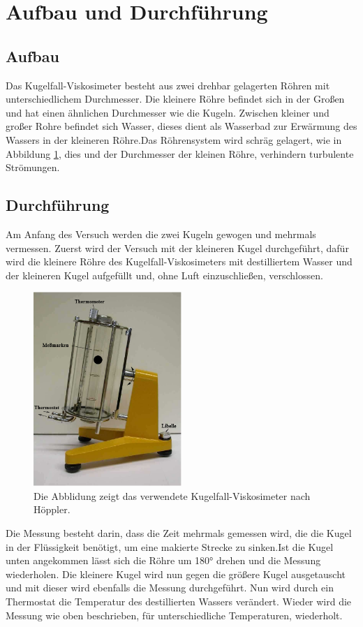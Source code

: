 \newpage
\section{Aufbau und Durchführung}
\subsection{Aufbau}
Das Kugelfall-Viskosimeter besteht aus zwei drehbar gelagerten Röhren mit unterschiedlichem Durchmesser.
Die kleinere Röhre befindet sich in der Großen und hat einen ähnlichen Durchmesser wie die Kugeln.
Zwischen kleiner und großer Rohre befindet sich Wasser, dieses dient als Wasserbad zur Erwärmung des
Wassers in der kleineren Röhre.Das Röhrensystem wird schräg gelagert, wie in Abbildung \ref{abb:visko},
dies und der Durchmesser der kleinen Röhre, verhindern turbulente Strömungen.
\subsection{Durchführung}
\label{sec:Durchführung}
Am Anfang des Versuch werden die zwei Kugeln gewogen
und mehrmals vermessen. Zuerst wird der Versuch mit
der kleineren Kugel durchgeführt, dafür wird die kleinere
Röhre des Kugelfall-Viskosimeters mit destilliertem Wasser und der kleineren Kugel
aufgefüllt und, ohne Luft einzuschließen, verschlossen.
\begin{figure}
 \centering
 \includegraphics[width=0.5\textwidth]{bild.PNG}
\caption{Die Abblidung zeigt das verwendete Kugelfall-Viskosimeter nach Höppler.\cite{sample}}
\label{abb:visko}
\end{figure}
Die Messung besteht darin, dass die Zeit mehrmals
gemessen wird, die die Kugel in der Flüssigkeit benötigt,
um eine makierte Strecke zu sinken.Ist die Kugel unten angekommen
lässt sich die Röhre um 180° drehen und die Messung wiederholen.
Die kleinere Kugel wird nun gegen die größere Kugel
ausgetauscht und mit dieser wird ebenfalls die Messung
durchgeführt. Nun wird durch ein Thermostat
die Temperatur des destillierten Wassers verändert.
Wieder wird die Messung wie oben beschrieben,
für unterschiedliche
Temperaturen, wiederholt.
